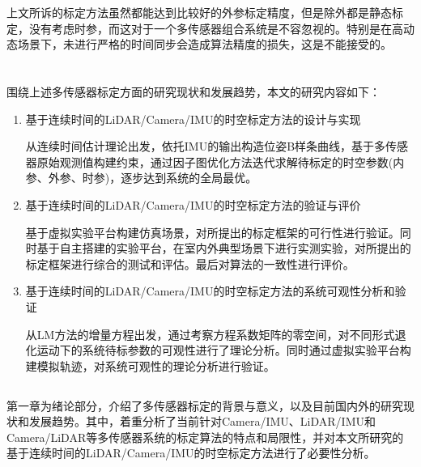 上文所诉的标定方法虽然都能达到比较好的外参标定精度，但是除\cite{park2020spatiotemporal}外都是静态标定，没有考虑时参，而这对于一个多传感器组合系统是不容忽视的。特别是在高动态场景下，未进行严格的时间同步会造成算法精度的损失，这是不能接受的。

\section{}

\subsection{}
围绕上述多传感器标定方面的研究现状和发展趋势，本文的研究内容如下：
\begin{enumerate}
    \item 基于连续时间的LiDAR/Camera/IMU的时空标定方法的设计与实现
    
    从连续时间估计理论出发，依托IMU的输出构造位姿B样条曲线，基于多传感器原始观测值构建约束，通过因子图优化方法迭代求解待标定的时空参数(内参、外参、时参)，逐步达到系统的全局最优。

    \item 基于连续时间的LiDAR/Camera/IMU的时空标定方法的验证与评价
    
    基于虚拟实验平台构建仿真场景，对所提出的标定框架的可行性进行验证。同时基于自主搭建的实验平台，在室内外典型场景下进行实测实验，对所提出的标定框架进行综合的测试和评估。最后对算法的一致性进行评价。
    
    \item 基于连续时间的LiDAR/Camera/IMU的时空标定方法的系统可观性分析和验证
    
    从LM方法的增量方程出发，通过考察方程系数矩阵的零空间，对不同形式退化运动下的系统待标参数的可观性进行了理论分析。同时通过虚拟实验平台构建模拟轨迹，对系统可观性的理论分析进行验证。
    
\end{enumerate}

\subsection{}

第一章为绪论部分，介绍了多传感器标定的背景与意义，以及目前国内外的研究现状和发展趋势。其中，着重分析了当前针对Camera/IMU、LiDAR/IMU和Camera/LiDAR等多传感器系统的标定算法的特点和局限性，并对本文所研究的基于连续时间的LiDAR/Camera/IMU的时空标定方法进行了必要性分析。

